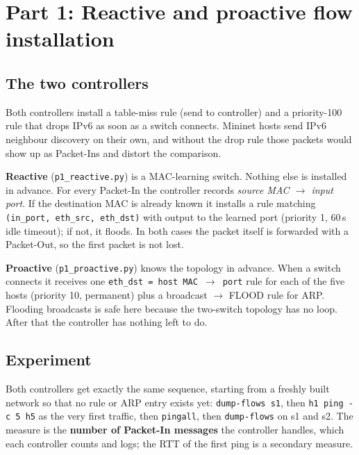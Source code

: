 \documentclass[11pt]{article}
\begin{document}
\section{Part 1: Reactive and proactive flow installation}

\subsection{The two controllers}
Both controllers install a table-miss rule (send to controller) and a priority-100 rule that drops
IPv6 as soon as a switch connects. Mininet hosts send IPv6 neighbour discovery on their own, and
without the drop rule those packets would show up as Packet-Ins and distort the comparison.

\textbf{Reactive} (\texttt{p1\_reactive.py}) is a MAC-learning switch. Nothing else is installed in
advance. For every Packet-In the controller records \emph{source MAC $\to$ input port}. If the
destination MAC is already known it installs a rule matching
\texttt{(in\_port, eth\_src, eth\_dst)} with output to the learned port (priority 1, 60\,s idle
timeout); if not, it floods. In both cases the packet itself is forwarded with a Packet-Out, so the
first packet is not lost.

\textbf{Proactive} (\texttt{p1\_proactive.py}) knows the topology in advance. When a switch connects
it receives one \texttt{eth\_dst = host MAC $\to$ port} rule for each of the five hosts (priority 10,
permanent) plus a broadcast $\to$ FLOOD rule for ARP. Flooding broadcasts is safe here because the
two-switch topology has no loop. After that the controller has nothing left to do.

\subsection{Experiment}
Both controllers get exactly the same sequence, starting from a freshly built network so that no rule
or ARP entry exists yet: \texttt{dump-flows s1}, then \texttt{h1 ping -c 5 h5} as the very first
traffic, then \texttt{pingall}, then \texttt{dump-flows} on s1 and s2. The measure is the
\textbf{number of Packet-In messages} the controller handles, which each controller counts and logs;
the RTT of the first ping is a secondary measure.
\end{document}
